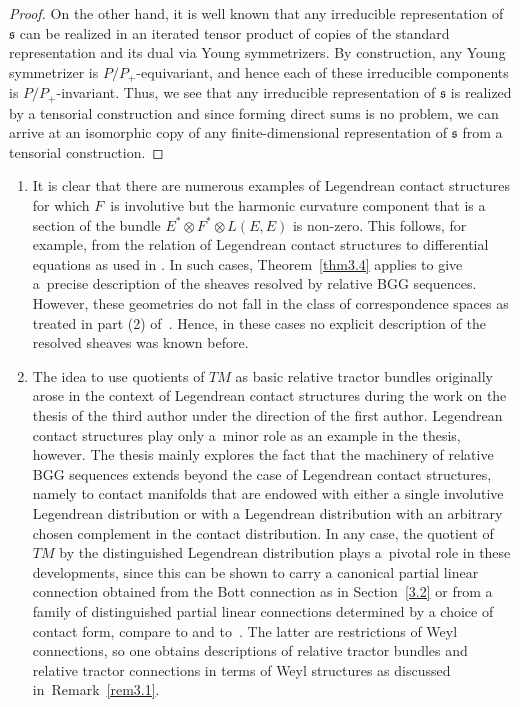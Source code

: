 \documentclass[10pt,a4paper]{amsart}
\numberwithin{equation}{section}
\def\frak{\mathfrak}
\begin{document}
\begin{proof}
On the other hand, it is well known that any irreducible representation of $\frak s$
can be realized in an iterated tensor product of copies of the standard
representation and its dual via Young symmetrizers. By construction, any Young
symmetrizer is $P/P_+$-equivariant, and hence each of these irreducible components is
$P/P_+$-invariant. Thus, we see that any irreducible representation of $\frak s$ is
realized by a tensorial construction and since forming direct sums is no problem, we
can arrive at an isomorphic copy of any finite-dimensional representation of $\frak
s$ from a tensorial construction.
\end{proof}


\begin{Remark}\label{rem3.4} \quad
\begin{enumerate}\itemsep=0pt
\item[(1)] It is clear that there are numerous examples of
Legendrean contact structures for which $F$~is involutive but the harmonic curvature
component that is a section of the bundle $E^*\otimes F^*\otimes L(E,E)$ is non-zero.
This follows, for example, from the relation of Legendrean contact structures to
differential equations as used in \cite{MFMZ}. In such cases, Theorem~\ref{thm3.4}
applies to give a~precise description of the sheaves resolved by relative BGG
sequences. However, these geometries do not fall in the class of correspondence
spaces as treated in part (2) of~\mbox{\cite[Theorem~4.11]{Rel-BGG2}}. Hence, in these
cases no explicit description of the resolved sheaves was known before.
\item[(2)] The idea to use quotients of $TM$ as basic relative tractor bundles originally
arose in the context of Legendrean contact structures during the work on the thesis
\cite{Michal-thesis} of the third author under the direction of the first
author. Legendrean contact structures play only a~minor role as an example in the
thesis, however. The thesis mainly explores the fact that the machinery of relative
BGG sequences extends beyond the case of Legendrean contact structures, namely to
contact manifolds that are endowed with either a single involutive Legendrean
distribution or with a Legendrean distribution with an arbitrary chosen complement in
the contact distribution. In any case, the quotient of $TM$ by the distinguished
Legendrean distribution plays a~pivotal role in these developments, since this can be
shown to carry a canonical partial linear connection obtained from the Bott
connection as in Section~\ref{3.2} or from a family of distinguished partial linear
connections determined by a choice of contact form, compare to \cite[Section 5.2.14]{book}
and to~\cite{Michal-article}. The latter are restrictions of Weyl
connections, so one obtains descriptions of relative tractor bundles and relative
tractor connections in terms of Weyl structures as discussed in~Remark~\ref{rem3.1}.
\end{enumerate}
\end{Remark}
\end{document}
